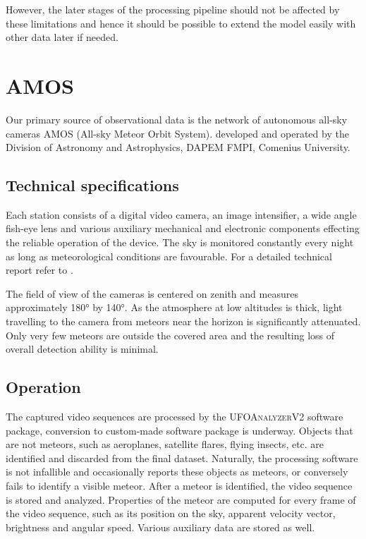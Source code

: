         However, the later stages of the processing pipeline should not be affected by these limitations
        and hence it should be possible to extend the model easily with other data later if needed.


\section{AMOS} \label{iA}
    Our primary source of observational data is the network of autonomous all-sky cameras
    AMOS (All-sky Meteor Orbit System).
    developed and operated by the Division of Astronomy and Astrophysics, DAPEM FMPI, Comenius University.

    \subsection{Technical specifications} \label{iAt}
        Each station consists of a digital video camera, an image intensifier, a wide angle fish-eye lens
        and various auxiliary mechanical and electronic components effecting
        the reliable operation of the device. The sky is monitored constantly every night
        as long as meteorological conditions are favourable. For a detailed technical report refer to \citet{zigo2013}.

        The field of view of the cameras is centered on zenith and measures approximately \ang{180} by \ang{140}.
        As the atmosphere at low altitudes is thick, light travelling to the camera from
        meteors near the horizon is significantly attenuated.
        Only very few meteors are outside the covered area and the resulting loss of overall detection ability is minimal.

    \subsection{Operation} \label{iAo}
        The captured video sequences are processed by the \textsc{UFOAnalyzerV2} software package,
        conversion to custom-made software package is underway.
        Objects that are not meteors, such as aeroplanes, satellite flares, flying insects, etc.
        are identified and discarded from the final dataset. Naturally, the processing software is not
        infallible and occasionally reports these objects as meteors, or conversely fails to identify a visible meteor.
        After a meteor is identified, the video sequence is stored and analyzed.
        Properties of the meteor are computed for every frame of the video sequence,
        such as its position on the sky, apparent velocity vector, brightness and angular speed.
        Various auxiliary data are stored as well.

